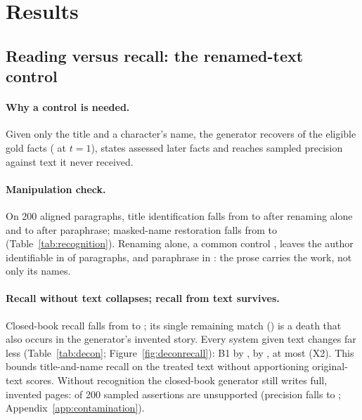 \section{Results}
\label{sec:results}

\subsection{Reading versus recall: the renamed-text control}
\label{sec:results-decon}

\paragraph{Why a control is needed.}
Given only the title and a character's name, the generator recovers
 of the eligible gold facts ( at $t=1$), states
 assessed later facts and reaches sampled precision
 against text it never received.

\paragraph{Manipulation check.}
On 200 aligned paragraphs, title identification falls from  to
 after renaming alone and to  after paraphrase;
masked-name restoration falls from  to 
(Table~\ref{tab:recognition}). Renaming alone, a common control
\citep{gupta2025whodunit,zhang2024infinitebench}, leaves the author identifiable in
 of paragraphs, and paraphrase in : the prose
carries the work, not only its names.

\paragraph{Recall without text collapses; recall from text survives.}
Closed-book recall falls from  to ; its
single remaining match () is a death that also occurs in the
generator's invented story. Every system given text changes far less
(Table~\ref{tab:decon}; Figure~\ref{fig:deconrecall}): B1 by ,
\sys by , at most  (X2). This bounds
title-and-name recall on the treated text without apportioning original-text scores.
Without recognition the closed-book generator still writes full, invented pages:
 of 200 sampled assertions are unsupported (precision
 falls to ; Appendix~\ref{app:contamination}).

